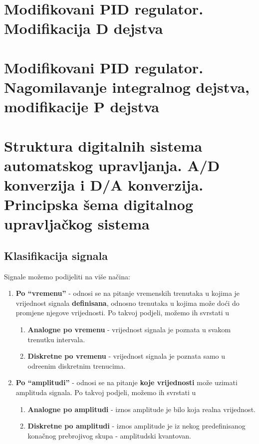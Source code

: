 \documentclass[12pt]{IEEEtran}
\numberwithin{equation}{subsection}
\numberwithin{figure}{section}
\begin{document}
\newpage
\section{\textbf{Modifikovani PID regulator. Modifikacija D dejstva}}

\newpage
\section{\textbf{Modifikovani PID regulator. Nagomilavanje integralnog dejstva, modifikacije P dejstva}}

\newpage
\section{\textbf{Struktura digitalnih sistema automatskog upravljanja. A/D konverzija i D/A konverzija. Principska \v{s}ema digitalnog upravlja\v{c}kog sistema}}

\subsection{\textbf{Klasifikacija signala}}

Signale mo\v{z}emo podijeliti na vi\v{s}e na\v{c}ina:

\begin{enumerate}
    \item \textbf{Po \enquote{vremenu}} - odnosi se na pitanje vremenskih trenutaka
    u kojima je vrijednost signala \textbf{definisana}, odnosno trenutaka 
    u kojima mo\v{z}e do\'{c}i do promjene njegove vrijednosti. Po takvoj podjeli,
    mo\v{z}emo ih svrstati u 

    \begin{enumerate}
        \item \textbf{Analogne po vremenu} - vrijednost signala je poznata
        u svakom trenutku intervala.
        \item \textbf{Diskretne po vremenu} - vrijednost signala je poznata
        samo u odre\dj{}enim diskretnim trenucima.
    \end{enumerate}

    \item \textbf{Po \enquote{amplitudi}} - odnosi se na pitanje \textbf{koje vrijednosti} 
    mo\v{z}e uzimati amplituda signala. Po takvoj podjeli, mo\v{z}emo ih 
    svrstati u 

    \begin{enumerate}
        \item \textbf{Analogne po amplitudi} - iznos amplitude je 
        bilo koja realna vrijednost.
        \item \textbf{Diskretne po amplitudi} - iznos amplitude je 
        iz nekog predefinisanog kona\v{c}nog prebrojivog skupa - amplitudski
        kvantovan.
    \end{enumerate}

\end{enumerate}
\end{document}
